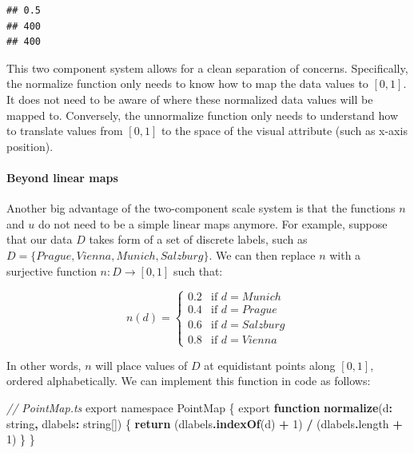 \documentclass[
]{book}
\newenvironment{Shaded}{\begin{snugshade}}{\end{snugshade}}
\newcommand{\AttributeTok}[1]{\textcolor[rgb]{0.13,0.29,0.53}{#1}}
\newcommand{\CommentTok}[1]{\textcolor[rgb]{0.56,0.35,0.01}{\textit{#1}}}
\newcommand{\ControlFlowTok}[1]{\textcolor[rgb]{0.13,0.29,0.53}{\textbf{#1}}}
\newcommand{\DataTypeTok}[1]{\textcolor[rgb]{0.13,0.29,0.53}{#1}}
\newcommand{\DecValTok}[1]{\textcolor[rgb]{0.00,0.00,0.81}{#1}}
\newcommand{\FunctionTok}[1]{\textcolor[rgb]{0.13,0.29,0.53}{\textbf{#1}}}
\newcommand{\ImportTok}[1]{#1}
\newcommand{\KeywordTok}[1]{\textcolor[rgb]{0.13,0.29,0.53}{\textbf{#1}}}
\newcommand{\NormalTok}[1]{#1}
\newcommand{\OperatorTok}[1]{\textcolor[rgb]{0.81,0.36,0.00}{\textbf{#1}}}
\theoremstyle{definition}
\theoremstyle{definition}
\theoremstyle{definition}
\theoremstyle{definition}
\theoremstyle{remark}
\begin{document}
\begin{verbatim}
## 0.5
## 400
## 400
\end{verbatim}

This two component system allows for a clean separation of concerns. Specifically, the normalize function only needs to know how to map the data values to \([0, 1]\). It does not need to be aware of where these normalized data values will be mapped to. Conversely, the unnormalize function only needs to understand how to translate values from \([0, 1]\) to the space of the visual attribute (such as x-axis position).

\paragraph{Beyond linear maps}\label{beyond-linear-maps}

Another big advantage of the two-component scale system is that the functions \(n\) and \(u\) do not need to be a simple linear maps anymore. For example, suppose that our data \(D\) takes form of a set of discrete labels, such as \(D = \{ Prague,  Vienna, Munich, Salzburg \}\). We can then replace \(n\) with a surjective function \(n: D \to [0, 1]\) such that:

\[n(d) = \begin{cases}  
0.2 & \text{if } d = Munich 
\\ 0.4 & \text{if } d = Prague 
\\ 0.6 & \text{if } d = Salzburg 
\\ 0.8 & \text{if } d = Vienna
\end{cases}\]

In other words, \(n\) will place values of \(D\) at equidistant points along \([0, 1]\), ordered alphabetically. We can implement this function in code as follows:

\begin{Shaded}
\begin{Highlighting}[]
\CommentTok{// PointMap.ts}
\ImportTok{export} \ImportTok{namespace} \DataTypeTok{PointMap}\NormalTok{ \{}
  \ImportTok{export} \KeywordTok{function} \FunctionTok{normalize}\NormalTok{(d}\OperatorTok{:} \DataTypeTok{string}\OperatorTok{,}\NormalTok{ dlabels}\OperatorTok{:} \DataTypeTok{string}\NormalTok{[]) \{}
    \ControlFlowTok{return}\NormalTok{ (dlabels}\OperatorTok{.}\FunctionTok{indexOf}\NormalTok{(d) }\OperatorTok{+} \DecValTok{1}\NormalTok{) }\OperatorTok{/}\NormalTok{ (dlabels}\OperatorTok{.}\AttributeTok{length} \OperatorTok{+} \DecValTok{1}\NormalTok{)}
\NormalTok{  \}}
\NormalTok{\}}
\end{Highlighting}
\end{Shaded}
\end{document}
